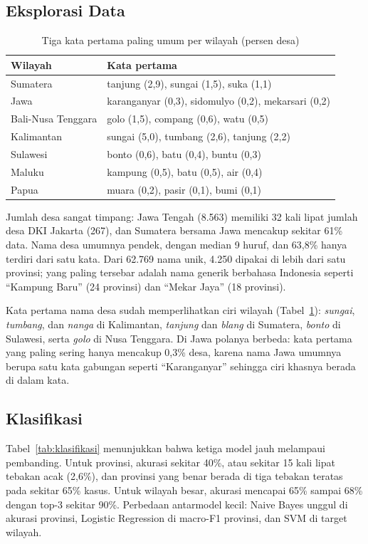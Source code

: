 \documentclass[conference]{IEEEtran}
\begin{document}
\subsection{Eksplorasi Data}

\begin{table}[!t]
\caption{Tiga kata pertama paling umum per wilayah (persen desa)}
\label{tab:katapertama}
\centering
\begin{tabular}{ll}
\toprule
Wilayah & Kata pertama \\
\midrule
Sumatera & tanjung (2,9), sungai (1,5), suka (1,1) \\
Jawa & karanganyar (0,3), sidomulyo (0,2), mekarsari (0,2) \\
Bali-Nusa Tenggara & golo (1,5), compang (0,6), watu (0,5) \\
Kalimantan & sungai (5,0), tumbang (2,6), tanjung (2,2) \\
Sulawesi & bonto (0,6), batu (0,4), buntu (0,3) \\
Maluku & kampung (0,5), batu (0,5), air (0,4) \\
Papua & muara (0,2), pasir (0,1), bumi (0,1) \\
\bottomrule
\end{tabular}
\end{table}

Jumlah desa sangat timpang: Jawa Tengah (8.563) memiliki 32 kali lipat jumlah desa DKI Jakarta (267), dan Sumatera bersama Jawa mencakup sekitar 61\% data. Nama desa umumnya pendek, dengan median 9 huruf, dan 63,8\% hanya terdiri dari satu kata. Dari 62.769 nama unik, 4.250 dipakai di lebih dari satu provinsi; yang paling tersebar adalah nama generik berbahasa Indonesia seperti ``Kampung Baru'' (24 provinsi) dan ``Mekar Jaya'' (18 provinsi).

Kata pertama nama desa sudah memperlihatkan ciri wilayah (Tabel~\ref{tab:katapertama}): \textit{sungai}, \textit{tumbang}, dan \textit{nanga} di Kalimantan, \textit{tanjung} dan \textit{blang} di Sumatera, \textit{bonto} di Sulawesi, serta \textit{golo} di Nusa Tenggara. Di Jawa polanya berbeda: kata pertama yang paling sering hanya mencakup 0,3\% desa, karena nama Jawa umumnya berupa satu kata gabungan seperti ``Karanganyar'' sehingga ciri khasnya berada di dalam kata.

\subsection{Klasifikasi}

Tabel~\ref{tab:klasifikasi} menunjukkan bahwa ketiga model jauh melampaui pembanding. Untuk provinsi, akurasi sekitar 40\%, atau sekitar 15 kali lipat tebakan acak (2,6\%), dan provinsi yang benar berada di tiga tebakan teratas pada sekitar 65\% kasus. Untuk wilayah besar, akurasi mencapai 65\% sampai 68\% dengan top-3 sekitar 90\%. Perbedaan antarmodel kecil: Naive Bayes unggul di akurasi provinsi, Logistic Regression di macro-F1 provinsi, dan SVM di target wilayah.
\end{document}
